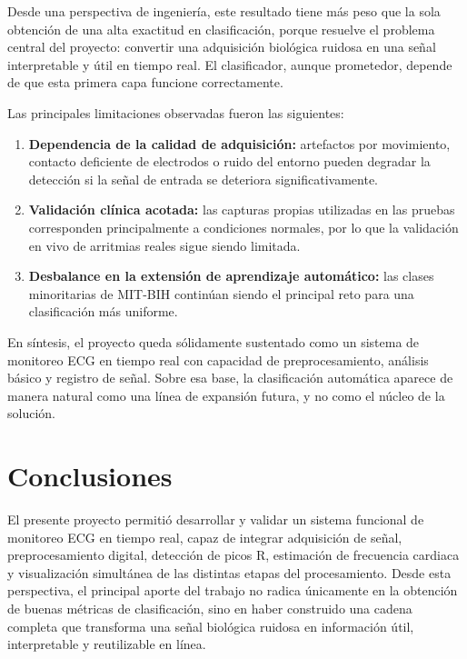 Desde una perspectiva de ingeniería, este resultado tiene más peso que la sola
obtención de una alta exactitud en clasificación, porque resuelve el problema
central del proyecto: convertir una adquisición biológica ruidosa en una señal
interpretable y útil en tiempo real. El clasificador, aunque prometedor, depende
de que esta primera capa funcione correctamente.

Las principales limitaciones observadas fueron las siguientes:

\begin{enumerate}
    \item \textbf{Dependencia de la calidad de adquisición:} artefactos por
        movimiento, contacto deficiente de electrodos o ruido del entorno pueden
        degradar la detección si la señal de entrada se deteriora significativamente.
    \item \textbf{Validación clínica acotada:} las capturas propias utilizadas en
        las pruebas corresponden principalmente a condiciones normales, por lo que
        la validación en vivo de arritmias reales sigue siendo limitada.
    \item \textbf{Desbalance en la extensión de aprendizaje automático:} las clases
        minoritarias de MIT-BIH continúan siendo el principal reto para una
        clasificación más uniforme.
\end{enumerate}

En síntesis, el proyecto queda sólidamente sustentado como un sistema de monitoreo
ECG en tiempo real con capacidad de preprocesamiento, análisis básico y registro
de señal. Sobre esa base, la clasificación automática aparece de manera natural
como una línea de expansión futura, y no como el núcleo de la solución.


\section{Conclusiones}

El presente proyecto permitió desarrollar y validar un sistema funcional de
monitoreo ECG en tiempo real, capaz de integrar adquisición de señal,
preprocesamiento digital, detección de picos R, estimación de frecuencia
cardiaca y visualización simultánea de las distintas etapas del procesamiento.
Desde esta perspectiva, el principal aporte del trabajo no radica únicamente en
la obtención de buenas métricas de clasificación, sino en haber construido una
cadena completa que transforma una señal biológica ruidosa en información útil,
interpretable y reutilizable en línea.

